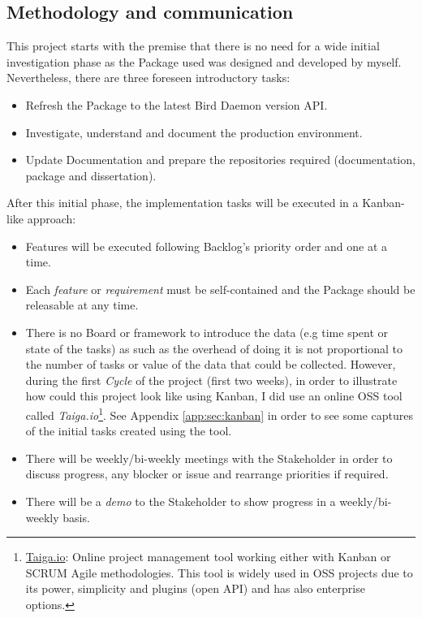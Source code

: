 \subsection{Methodology and communication}
This project starts with the premise that there is no need for a wide initial investigation phase as the Package used was designed and developed by myself. Nevertheless, there are three foreseen introductory tasks:
\begin{itemize}
    \item Refresh the Package to the latest Bird Daemon version API. 
    \item Investigate, understand and document the production environment.
    \item Update Documentation and prepare the repositories required (documentation, package and dissertation).
\end{itemize}

After this initial phase, the implementation tasks will be executed in a Kanban-like approach:
\begin{itemize}
    \item Features will be executed following Backlog's priority order and one at a time.
    \item Each \textit{feature} or \textit{requirement} must be self-contained and the Package should be releasable at any time.
    \item There is no Board or framework to introduce the data (e.g time spent or state of the tasks) as such as the overhead of doing it is not proportional to the number of tasks or value of the data that could be collected. However, during the first \textit{Cycle} of the project (first two weeks), in order to illustrate how could this project look like using Kanban, I did use an online OSS tool called \textit{Taiga.io}\footnote{\href{https://taiga.io/}{Taiga.io}: Online project management tool working either with Kanban or SCRUM Agile methodologies. This tool is widely used in OSS projects due to its power, simplicity and plugins (open API) and has also enterprise options.}. See Appendix \ref{app:sec:kanban} in order to see some captures of the initial tasks created using the tool.
    \item There will be weekly/bi-weekly meetings with the Stakeholder in order to discuss progress, any blocker or issue and rearrange priorities if required.
    \item There will be a \textit{demo} to the Stakeholder to show progress in a weekly/bi-weekly basis.
\end{itemize}

